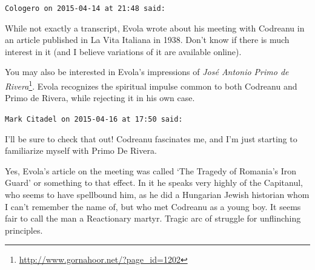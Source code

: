 \begin{footnotesize}
\begin{sffamily}
\hfill

\texttt{Cologero on 2015-04-14 at 21:48 said:}

While not exactly a transcript, Evola wrote about his meeting with Codreanu in an article published in La Vita Italiana in 1938. Don't know if there is much interest in it (and I believe variations of it are available online).

You may also be interested in Evola's impressions of \textit{José Antonio Primo de Rivera}\footnote{\url{http://www.gornahoor.net/?page\_id=1202}}. Evola recognizes the spiritual impulse common to both Codreanu and Primo de Rivera, while rejecting it in his own case.

\hfill

\texttt{Mark Citadel on 2015-04-16 at 17:50 said:}

I'll be sure to check that out! Codreanu fascinates me, and I'm just starting to familiarize myself with Primo De Rivera.

Yes, Evola's article on the meeting was called `The Tragedy of Romania's Iron Guard' or something to that effect. In it he speaks very highly of the Capitanul, who seems to have spellbound him, as he did a Hungarian Jewish historian whom I can't remember the name of, but who met Codreanu as a young boy. It seems fair to call the man a Reactionary martyr. Tragic arc of struggle for unflinching principles.


\hfill

\end{sffamily}
\end{footnotesize}

